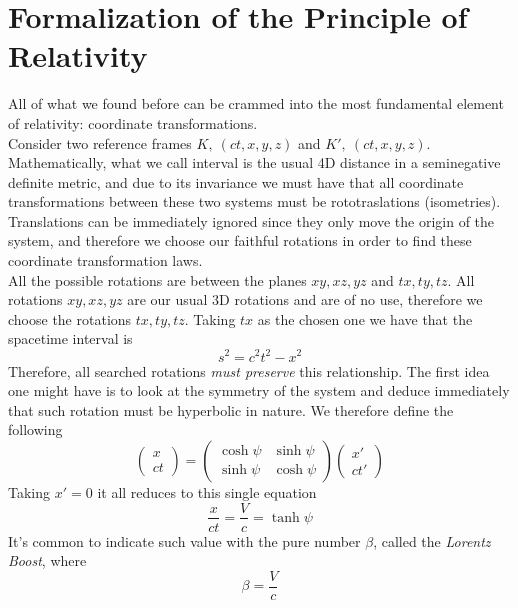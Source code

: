 \documentclass[../electromagnetism.tex]{subfiles}
\begin{document}
\section{Formalization of the Principle of Relativity}
All of what we found before can be crammed into the most fundamental element of relativity: coordinate transformations.\\
Consider two reference frames $K,\ (ct,x,y,z)$ and $K',\ (ct,x,y,z)$. Mathematically, what we call interval is the usual 4D distance in a seminegative definite metric, and due to its invariance we must have that all coordinate transformations between these two systems must be rototraslations (isometries). Translations can be immediately ignored since they only move the origin of the system, and therefore we choose our faithful rotations in order to find these coordinate transformation laws.\\
All the possible rotations are between the planes $xy,xz,yz$ and $tx,ty,tz$. All rotations $xy,xz,yz$ are our usual 3D rotations and are of no use, therefore we choose the rotations $tx,ty,tz$. Taking $tx$ as the chosen one we have that the spacetime interval is
\begin{equation*}
	s^2=c^2t^2-x^2
\end{equation*}
Therefore, all searched rotations \textit{must preserve} this relationship. The first idea one might have is to look at the symmetry of the system and deduce immediately that such rotation must be hyperbolic in nature. We therefore define the following
\begin{equation}
	\begin{pmatrix}x\\ct\end{pmatrix}=\begin{pmatrix}\cosh\psi&\sinh\psi\\\sinh\psi&\cosh\psi\end{pmatrix}\begin{pmatrix}x'\\ct'\end{pmatrix}
	\label{eq:hyprotm}
\end{equation}
Taking $x'=0$ it all reduces to this single equation
\begin{equation}
	\frac{x}{ct}=\frac{V}{c}=\tanh\psi
	\label{eq:ctransfhyp}
\end{equation}
It's common to indicate such value with the pure number $\beta$, called the \emph{Lorentz Boost}, where
\begin{equation*}
	\beta=\frac{V}{c}
\end{equation*}
\end{document}
